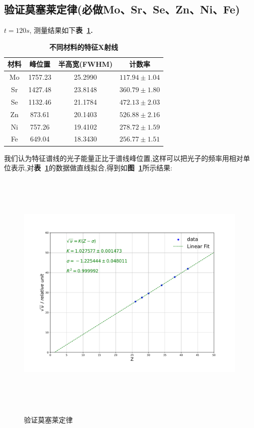 \documentclass[a4paper]{article}
\begin{document}
\subsection{验证莫塞莱定律(必做Mo、Sr、Se、Zn、Ni、Fe)}\label{sub1}
$t=120s$,
测量结果如下\textbf{表~\ref{tab:table1}.}
\begin{table}[H]
\caption{\textbf{不同材料的特征X射线}}
\label{tab:table1}
\begin{center}
\setlength{\tabcolsep}{7mm}
\begin{tabular}{|c|c|c|c|}%
    \toprule
	\hline
	材料 & 峰位置 & 半高宽(FWHM) & 计数率 \\ \hline \hline
	Mo & 1757.23 & 25.2990 & $117.94\pm1.04$ \\ \hline
	Sr & 1427.48 & 23.8148 & $360.79\pm1.80$ \\ \hline
	Se & 1132.46 & 21.1784 & $472.13\pm2.03$ \\ \hline
	Zn & 873.61 & 20.1403 & $526.88\pm2.16$ \\ \hline
	Ni & 757.26 & 19.4102 & $278.72\pm1.59$ \\ \hline
	Fe & 649.04 & 18.3430 & $256.77\pm1.51$ \\ \hline
	\bottomrule
	\end{tabular}
\end{center}
\end{table}
我们认为特征谱线的光子能量正比于谱线峰位置,这样可以把光子的频率用相对单位表示,对\textbf{表~\ref{tab:table1}}的数据做直线拟合,得到如\textbf{图~\ref{fig:fig1}}所示结果:
\begin{figure}[H]
 \centering
 \caption{验证莫塞莱定律}
 \includegraphics[height=12cm, width=16cm]{images/phyex1_fig.pdf}
 \label{fig:fig1}
\end{figure}
\end{document}
